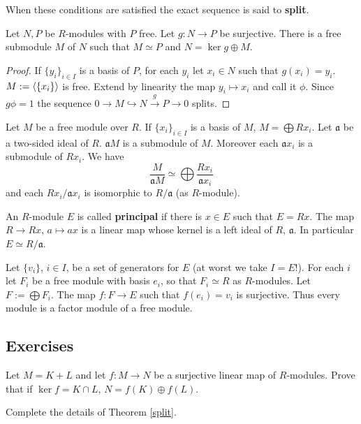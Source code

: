 When these conditions are satisfied the exact sequence is said to \textbf{split}. 

\begin{cor} \label{corollary} Let $N,P$ be $R$-modules with $P$ free. 
Let $g:N \to P$ be surjective. 
There is a free submodule $M$ of $N$ such that $M \simeq P$ and $N = \ker g \oplus M $.
\begin{proof} If $\{y_i\}_{i \in I}$ is a basis of $P$, for each $y_i$ let $x_i \in N$ such that $g(x_i) = y_i$. $M:=\langle \{x_i\} \rangle$ is free. 
Extend by linearity the map $y_i \mapsto x_i$ and call it $\phi$. 
Since $g \phi =1$ the sequence $ 0 \to M \hookrightarrow N \xrightarrow{g} P \to 0$ splits. 
\end{proof}
\end{cor}

Let $M$ be a free module over $R$. If $\{x_i\}_{i \in I}$ is a basis of $M$, $M=\bigoplus Rx_i$. 
Let $\mathfrak{a}$ be a two-sided ideal of $R$. $\mathfrak{a}M$ is a submodule of $M$. 
Moreover each $\mathfrak{a}x_i$ is a submodule of $Rx_i$. 
We have $$\frac{M}{\mathfrak{a}M} \simeq \bigoplus \frac{Rx_i}{\mathfrak{a}x_i}$$ 
and each $Rx_i/\mathfrak{a}x_i$ is isomorphic to $R/\mathfrak{a}$ (as $R$-module). 

An $R$-module $E$ is called \textbf{principal} if there is $x \in E$ such that $E=Rx$. 
The map $R \to Rx$, $a \mapsto ax$ is a linear map whose kernel is a left ideal of $R$, $\mathfrak{a}$. 
In particular $E \simeq R/\mathfrak{a}$. 

\begin{rem} \label{free} Let $\{v_i\}$, $i \in I$, be a set of generators for $E$ (at worst we take $I=E$!). 
For each $i$ let $F_i$ be a free module with basis $e_i$, so that $F_i \simeq R$ as $R$-modules. 
Let $F:=\bigoplus F_i$. The map $f: F \to E$ such that $f(e_i)=v_i$ is surjective. 
Thus every module is a factor module of a free module. 
\end{rem}

\subsection*{Exercises}

\begin{ex} \label{free1}
Let $M = K + L$ and let $f:M \to N$ be a surjective linear map of $R$-modules.
Prove that if $\ker f = K \cap L$, $N = f(K) \oplus f(L)$. 
\end{ex}

\begin{ex}
Complete the details of Theorem \ref{split}.
\end{ex}
